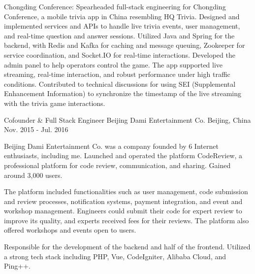 \begin{cventries}
{\begin{cvitems}
    \item {Chongding Conference: Spearheaded full-stack engineering for Chongding Conference, a mobile trivia app in China resembling HQ Trivia. Designed and implemented services and APIs to handle live trivia events, user management, and real-time question and answer sessions. Utilized Java and Spring for the backend, with Redis and Kafka for caching and message queuing, Zookeeper for service coordination, and Socket.IO for real-time interactions. Developed the admin panel to help operators control the game. The app supported live streaming, real-time interaction, and robust performance under high traffic conditions. Contributed to technical discussions for using SEI (Supplemental Enhancement Information) to synchronize the timestamp of the live streaming with the trivia game interactions.}
  \end{cvitems}
}

\cventry
{Cofounder \& Full Stack Engineer} %
{Beijing Dami Entertainment Co.} %
{Beijing, China} %
{Nov. 2015 - Jul. 2016} %
{
  \begin{cvitems} %
    \item {Beijing Dami Entertainment Co. was a company founded by 6 Internet enthusiasts, including me. Launched and operated the platform CodeReview, a professional platform for code review, communication, and sharing. Gained around 3,000 users.}
    \item {The platform included functionalities such as user management, code submission and review processes, notification systems, payment integration, and event and workshop management. Engineers could submit their code for expert review to improve its quality, and experts received fees for their reviews. The platform also offered workshops and events open to users.}
    \item {Responsible for the development of the backend and half of the frontend. Utilized a strong tech stack including PHP, Vue, CodeIgniter, Alibaba Cloud, and Ping++.}
  \end{cvitems}
}


\end{cventries}
